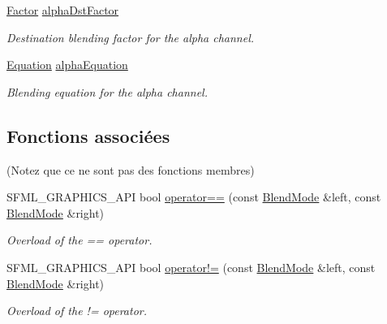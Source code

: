 \begin{DoxyCompactItemize}
\mbox{\label{structsf_1_1BlendMode_aaf85b6b7943181cc81745569c4851e4e}} 
\hyperlink{structsf_1_1BlendMode_afb9852caf356b53bb0de460c58a9ebbb}{Factor} \hyperlink{structsf_1_1BlendMode_aaf85b6b7943181cc81745569c4851e4e}{alpha\+Dst\+Factor}
\begin{DoxyCompactList}\small\item\em Destination blending factor for the alpha channel. \end{DoxyCompactList}\item 
\mbox{\label{structsf_1_1BlendMode_a68f5a305e0912946f39ba6c9265710c4}} 
\hyperlink{structsf_1_1BlendMode_a7bce470e2e384c4f9c8d9595faef7c32}{Equation} \hyperlink{structsf_1_1BlendMode_a68f5a305e0912946f39ba6c9265710c4}{alpha\+Equation}
\begin{DoxyCompactList}\small\item\em Blending equation for the alpha channel. \end{DoxyCompactList}\end{DoxyCompactItemize}
\subsection*{Fonctions associées}
(Notez que ce ne sont pas des fonctions membres) \begin{DoxyCompactItemize}
\item 
S\+F\+M\+L\+\_\+\+G\+R\+A\+P\+H\+I\+C\+S\+\_\+\+A\+PI bool \hyperlink{structsf_1_1BlendMode_ae13d2e80e55c5263eb9413fde7f74443}{operator==} (const \hyperlink{structsf_1_1BlendMode}{Blend\+Mode} \&left, const \hyperlink{structsf_1_1BlendMode}{Blend\+Mode} \&right)
\begin{DoxyCompactList}\small\item\em Overload of the == operator. \end{DoxyCompactList}\item 
S\+F\+M\+L\+\_\+\+G\+R\+A\+P\+H\+I\+C\+S\+\_\+\+A\+PI bool \hyperlink{structsf_1_1BlendMode_a0c08bfcb9b6911104dcc0c0cddde522a}{operator!=} (const \hyperlink{structsf_1_1BlendMode}{Blend\+Mode} \&left, const \hyperlink{structsf_1_1BlendMode}{Blend\+Mode} \&right)
\begin{DoxyCompactList}\small\item\em Overload of the != operator. \end{DoxyCompactList}\end{DoxyCompactItemize}


